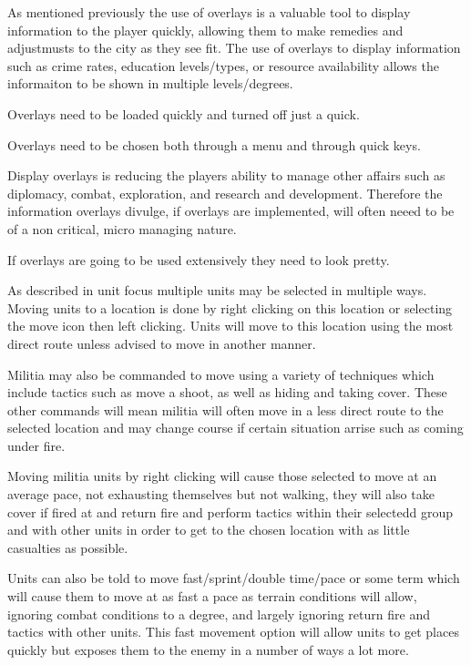 As mentioned previously the use of overlays is a valuable tool to display information to the player quickly, allowing them to make remedies and adjustmusts to the city as they see fit. The use of overlays to display information such as crime rates, education levels/types, or resource availability allows the informaiton to be shown in multiple levels/degrees. 

Overlays need to be loaded quickly and turned off just a quick.

Overlays need to be chosen both through a menu and through quick keys.

Display overlays is reducing the players ability to manage other affairs such as diplomacy, combat, exploration, and research and development. Therefore the information overlays divulge, if overlays are implemented, will often neeed to be of a non critical, micro managing nature.

If overlays are going to be used extensively they need to look pretty.



As described in unit focus multiple units may be selected in multiple ways. Moving units to a location is done by right clicking on this location or selecting the move icon then left clicking. Units will move to this location using the most direct route unless advised to move in another manner.

Militia may also be commanded to move using a variety of techniques which include tactics such as move a shoot, as well as hiding and taking cover. These other commands will mean militia will often move in a less direct route to the selected location and may change course if certain situation arrise such as coming under fire.

Moving militia units by right clicking will cause those selected to move at an average pace, not exhausting themselves but not walking, they will also take cover if fired at and return fire and perform tactics within their selectedd group and with other units in order to get to the chosen location with as little casualties as possible.

Units can also be told to move fast/sprint/double time/pace or some term which will cause them to move at as fast a pace as terrain conditions will allow, ignoring combat conditions to a degree, and largely ignoring return fire and tactics with other units. This fast movement option will allow units to get places quickly but exposes them to the enemy in a number of ways a lot more.

